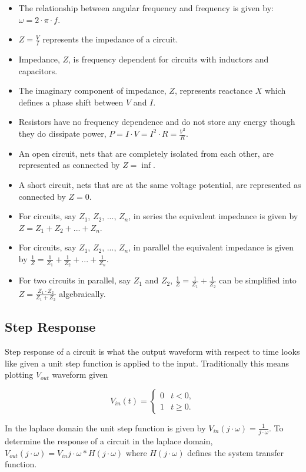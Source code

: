 \documentclass[main.tex]{subfiles}
\begin{document}
\begin{itemize}
    \item The relationship between angular frequency and frequency is given by: $\omega = 2 \cdot \pi \cdot f$.
    \item $Z = \frac{V}{I}$ represents the impedance of a circuit. 
    \item Impedance, $Z$, is frequency dependent for circuits with inductors and capacitors.
    \item The imaginary component of impedance, $Z$, represents reactance $X$ which defines a phase shift between $V$ and $I$.
    \item Resistors have no frequency dependence and do not store any energy though they do dissipate power, $P = I \cdot V = I^{2} \cdot R = \frac{V^2}{R}$.
    \item An open circuit, nets that are completely isolated from each other, are represented as connected by $Z = \inf$.
    \item A short circuit, nets that are at the same voltage potential, are represented as connected by $Z = 0$. 
    \item For circuits, say $Z_1$, $Z_2$, ..., $Z_n$, in series the equivalent impedance is given by $Z = Z_1 + Z_2 + ... + Z_n$.
    \item For circuits, say $Z_1$, $Z_2$, ..., $Z_n$, in parallel the equivalent impedance is given by $\frac{1}{Z} = \frac{1}{Z_1} + \frac{1}{Z_2} + ... + \frac{1}{Z_n}$.
    \item For two circuits in parallel, say $Z_1$ and $Z_2$, $\frac{1}{Z} = \frac{1}{Z_1} + \frac{1}{Z_2}$ can be simplified into $Z = \frac{Z_1 \cdot Z_2}{Z_1 + Z_2}$ algebraically.  
\end{itemize}

\subsection{Step Response}
Step response of a circuit is what the output waveform with respect to time looks like given a unit step function is applied to the input. Traditionally this means plotting $V_{out}$ waveform given 

\[
    V_{in}(t) =
    \begin{cases} 
        0 & t < 0, \\
        1 & t \geq 0.
    \end{cases}
\]

In the laplace domain the unit step function is given by $V_{in}(j \cdot \omega) = \frac{1}{j \cdot \omega}$. To determine the response of a circuit in the laplace domain, $V_{out}(j \cdot \omega) = V_{in}{j \cdot \omega} * H(j \cdot \omega)$ where $H(j \cdot \omega)$ defines the system transfer function.
\end{document}
